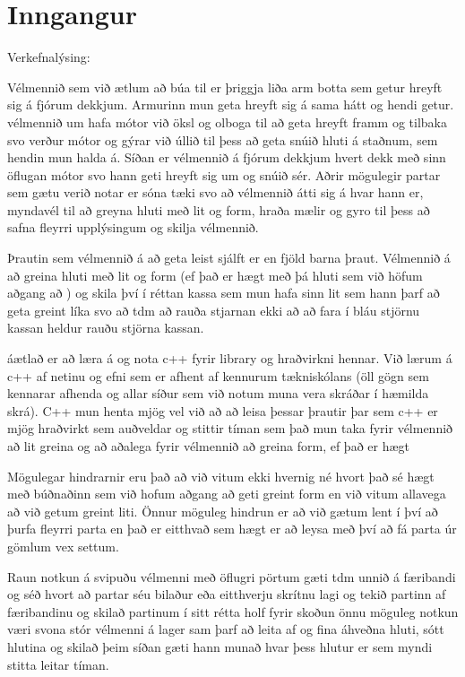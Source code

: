 \section{Inngangur}
Verkefnalýsing: 

Vélmennið sem við ætlum að búa til er þriggja liða arm botta sem getur hreyft sig á fjórum dekkjum. Armurinn mun geta hreyft 
sig á sama hátt og hendi getur. vélmennið um hafa mótor við öksl og olboga til að geta hreyft framm og tilbaka svo verður mótor 
og gýrar við úllið til þess að geta snúið hluti á staðnum, sem hendin mun halda á. Síðan er vélmennið á fjórum dekkjum hvert 
dekk með sinn öflugan mótor svo hann geti hreyft sig um og snúið sér. Aðrir mögulegir partar sem gætu verið notar er sóna tæki 
svo að vélmennið átti sig á hvar hann er, myndavél til að greyna hluti með lit og form, hraða mælir og gyro til þess að safna 
fleyrri upplýsingum og skilja vélmennið.

Þrautin sem vélmennið á að geta leist sjálft er en fjöld barna þraut. Vélmennið á að greina hluti með lit og form (ef það er hægt
með þá hluti sem við höfum aðgang að ) og skila því í réttan kassa sem mun hafa sinn lit sem hann þarf að geta greint líka svo að 
tdm að rauða stjarnan ekki að að fara í bláu stjörnu kassan heldur rauðu stjörna kassan.

áætlað er að læra á og nota c++ fyrir library og hraðvirkni hennar. Við lærum á c++ af netinu og efni sem er afhent af kennurum 
tækniskólans (öll gögn sem kennarar afhenda og allar síður sem við notum muna vera skráðar í hæmilda skrá). C++ mun henta mjög vel
við að að leisa þessar þrautir þar sem c++ er mjög hraðvirkt sem auðveldar og stittir tíman sem það mun taka fyrir vélmennið að 
lit greina og að aðalega fyrir vélmennið að greina form, ef það er hægt

Mögulegar hindrarnir eru það að við vitum ekki hvernig né hvort það sé hægt með búðnaðinn sem við hofum aðgang að geti greint form en
við vitum allavega að við getum greint liti. Önnur möguleg hindrun er að við gætum lent í því að þurfa fleyrri parta en það er 
eitthvað sem hægt er að leysa með því að fá parta úr gömlum vex settum.

Raun notkun á svipuðu vélmenni með öflugri pörtum gæti tdm unnið á færibandi og séð hvort að partar séu bilaður eða eitthverju skrítnu
lagi og tekið partinn af færibandinu og skilað partinum í sitt rétta holf fyrir skoðun önnu möguleg notkun væri svona stór vélmenni á
lager sam þarf að leita af og fina áhveðna hluti, sótt hlutina og skilað þeim síðan gæti hann munað hvar þess hlutur er sem myndi stitta
leitar tíman.


